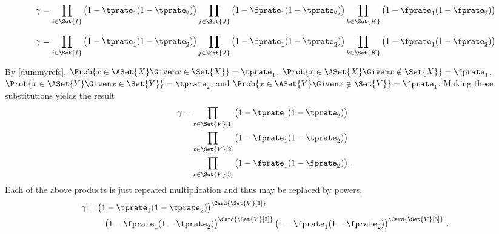 \documentclass[ ../main.tex]{subfiles}
\newcommand{\tsr}{\gamma}
\begin{document}
\begin{equation}
\tsr =
\prod_{i \in \Set{I}}
\left(1 - \tprate_1
(1 - \tprate_2)\right)
\prod_{j \in \Set{J}}
\left(1 - \fprate_1
(1 - \tprate_2)\right)
\prod_{k \in \Set{K}}
\left(1 - \fprate_1
(1 - \fprate_2)\right)
\end{equation}



\begin{equation}
\tsr =
\prod_{i \in \Set{I}}
\left(1 - \tprate_1
(1 - \tprate_2)\right)
\prod_{j \in \Set{J}}
\left(1 - \fprate_1
(1 - \tprate_2)\right)
\prod_{k \in \Set{K}}
\left(1 - \fprate_1
(1 - \fprate_2)\right)
\end{equation}



By \cref{dummyrefs}, $\Prob{x \in \ASet{X} \Given x \in \Set{X}} = \tprate_1$, 
$\Prob{x \in \ASet{X} \Given x \notin \Set{X}} = \fprate_1$, $\Prob{x \in 
	\ASet{Y} \Given x \in \Set{Y}} = \tprate_2$, and $\Prob{x \in \ASet{Y} \Given x 
	\notin \Set{Y}} = \fprate_1$. Making these substitutions yields the result
\begin{equation}
\begin{split}
\tsr =
&\prod_{x \in \Set{V}[1]}
\left(1 -
\tprate_1
(1 - \tprate_2)
\right)\\
&\prod_{x \in \Set{V}[2]}
\left(1 -
\fprate_1
(1 - \tprate_2)
\right)\\
&\prod_{x \in \Set{V}[3]}
\left(1 -
\fprate_1
(1 - \fprate_2)
\right)\,.  
\end{split}    
\end{equation}
Each of the above products is just repeated multiplication and thus may be 
replaced by powers,
\begin{equation}
\begin{split}
\tsr &=
\left(1 - \tprate_1(1 - \tprate_2)\right)^{\Card{\Set{V}[1]}}\\
&\qquad \left(1 - \fprate_1(1 - \tprate_2)\right)^{\Card{\Set{V}[2]}}
\left(1 - \fprate_1(1 - \fprate_2)\right)^{\Card{\Set{V}[3]}}\,.  
\end{split}
\end{equation}
\end{document}
